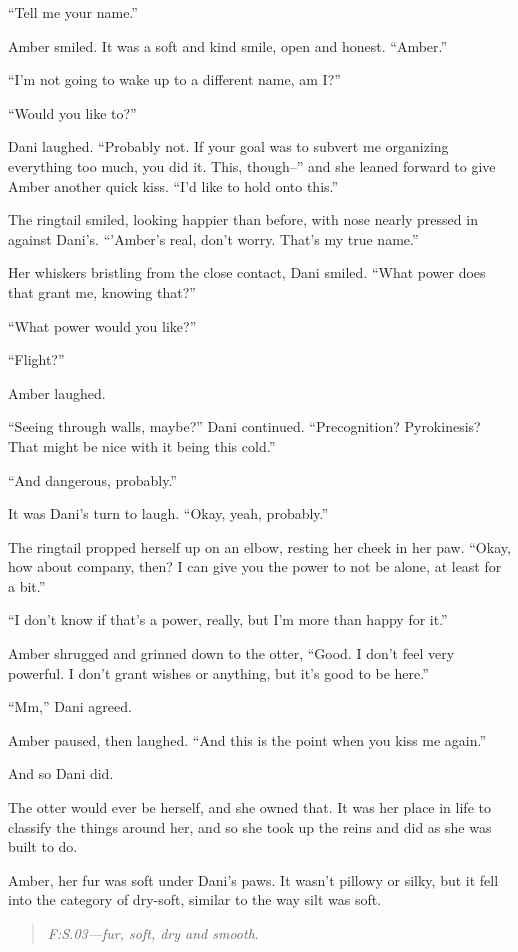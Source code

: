 ``Tell me your name.''

Amber smiled. It was a soft and kind smile, open and honest. ``Amber.''

``I'm not going to wake up to a different name, am I?''

``Would you like to?''

Dani laughed. ``Probably not. If your goal was to subvert me organizing everything too much, you did it. This, though--'' and she leaned forward to give Amber another quick kiss. ``I'd like to hold onto this.''

The ringtail smiled, looking happier than before, with nose nearly pressed in against Dani's. ``'Amber's real, don't worry. That's my true name.''

Her whiskers bristling from the close contact, Dani smiled. ``What power does that grant me, knowing that?''

``What power would you like?''

``Flight?''

Amber laughed.

``Seeing through walls, maybe?'' Dani continued. ``Precognition? Pyrokinesis? That might be nice with it being this cold.''

``And dangerous, probably.''

It was Dani's turn to laugh. ``Okay, yeah, probably.''

The ringtail propped herself up on an elbow, resting her cheek in her paw. ``Okay, how about company, then? I can give you the power to not be alone, at least for a bit.''

``I don't know if that's a power, really, but I'm more than happy for it.''

Amber shrugged and grinned down to the otter, ``Good. I don't feel very powerful. I don't grant wishes or anything, but it's good to be here.''

``Mm,'' Dani agreed.

Amber paused, then laughed. ``And this is the point when you kiss me again.''

And so Dani did.

The otter would ever be herself, and she owned that. It was her place in life to classify the things around her, and so she took up the reins and did as she was built to do.

Amber, her fur was soft under Dani's paws. It wasn't pillowy or silky, but it fell into the category of dry-soft, similar to the way silt was soft.

\vspace{-0.2cm}
\begin{quote}
\emph{F:S.03---fur, soft, dry and smooth}.
\end{quote}
\vspace{-0.2cm}

